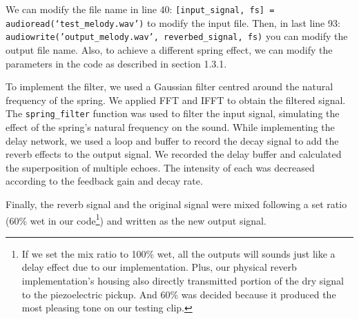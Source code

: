 \documentclass[12pt]{article}
\begin{document}
We can modify the file name in line 40: \texttt{\footnotesize [input\_signal, fs] = audioread(`test\_melody.wav')} to modify the input file. Then, in last line 93: \texttt{\footnotesize audiowrite('output\_melody.wav', reverbed\_signal, fs)} you can modify the output file name.  Also, to achieve a different spring effect, we can modify the parameters in the code as described in section 1.3.1.

To implement the filter, we used a Gaussian filter centred around the natural frequency of the spring. We applied FFT and IFFT to obtain the filtered signal. The \texttt{spring\_filter} function was used to filter the input signal, simulating the effect of the spring's natural frequency on the sound. While implementing the delay network, we used a loop and buffer to record the decay signal to add the reverb effects to the output signal. We recorded the delay buffer and calculated the superposition of multiple echoes. The intensity of each was decreased according to the feedback gain and decay rate. 

Finally, the reverb signal and the original signal were mixed following a set ratio (60\% wet in our code\footnote{\scriptsize If we set the mix ratio to 100\% wet, all the outputs will sounds just like a delay effect due to our implementation. Plus, our physical reverb implementation's housing also directly transmitted portion of the dry signal to the piezoelectric pickup. And 60\% was decided because it produced the most pleasing tone on our testing clip.}) and written as the new output signal. 
\end{document}
